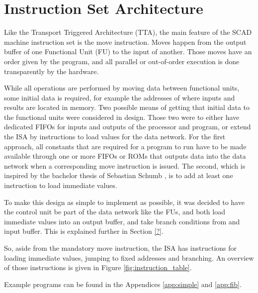 	\section{Instruction Set Architecture}
		Like the Transport Triggered Architecture (TTA), the main feature of the SCAD machine instruction set is the move instruction.
		Moves happen from the output buffer of one Functional Unit (FU) to the input of another.
		Those moves have an order given by the program, and all parallel or out-of-order execution is done transparently by the hardware.
		
		While all operations are performed by moving data between functional units, some initial data is required, for example the addresses of where inputs and results are located in memory.
		Two possible means of getting that initial data to the functional units were considered in design.
		Those two were to either have dedicated FIFOs for inputs and outputs of the processor and program, or extend the ISA by instructions to load values for the data network.
		For the first approach, all constants that are required for a program to run have to be made available through one or more FIFOs or ROMs that outputs data into the data network when a corresponding move instruction is issued.
		The second, which is inspired by the bachelor thesis of Sebastian Schumb \cite{Schu15}, is to add at least one instruction to load immediate values.
		
		To make this design as simple to implement as possible, it was decided to have the control unit be part of the data network like the FUs, and both load immediate values into an output buffer, and take branch conditions from and input buffer. This is explained further in Section \ref{?}.
		
		So, aside from the mandatory move instruction, the ISA has instructions for loading immediate values, jumping to fixed addresses and branching.
		An overview of those instructions is given in Figure \ref{fig:instruction_table}.
		
		Example programs can be found in the Appendices \ref{app:simple} and \ref{app:fib}.
		
